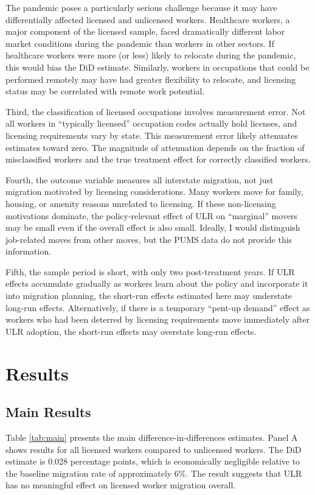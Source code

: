 \documentclass[12pt]{article}
\begin{document}
The pandemic poses a particularly serious challenge because it may have differentially affected licensed and unlicensed workers. Healthcare workers, a major component of the licensed sample, faced dramatically different labor market conditions during the pandemic than workers in other sectors. If healthcare workers were more (or less) likely to relocate during the pandemic, this would bias the DiD estimate. Similarly, workers in occupations that could be performed remotely may have had greater flexibility to relocate, and licensing status may be correlated with remote work potential.

Third, the classification of licensed occupations involves measurement error. Not all workers in ``typically licensed'' occupation codes actually hold licenses, and licensing requirements vary by state. This measurement error likely attenuates estimates toward zero. The magnitude of attenuation depends on the fraction of misclassified workers and the true treatment effect for correctly classified workers.

Fourth, the outcome variable measures all interstate migration, not just migration motivated by licensing considerations. Many workers move for family, housing, or amenity reasons unrelated to licensing. If these non-licensing motivations dominate, the policy-relevant effect of ULR on ``marginal'' movers may be small even if the overall effect is also small. Ideally, I would distinguish job-related moves from other moves, but the PUMS data do not provide this information.

Fifth, the sample period is short, with only two post-treatment years. If ULR effects accumulate gradually as workers learn about the policy and incorporate it into migration planning, the short-run effects estimated here may understate long-run effects. Alternatively, if there is a temporary ``pent-up demand'' effect as workers who had been deterred by licensing requirements move immediately after ULR adoption, the short-run effects may overstate long-run effects.

\section{Results}

\subsection{Main Results}

Table \ref{tab:main} presents the main difference-in-differences estimates. Panel A shows results for all licensed workers compared to unlicensed workers. The DiD estimate is 0.028 percentage points, which is economically negligible relative to the baseline migration rate of approximately 6\%. The result suggests that ULR has no meaningful effect on licensed worker migration overall.
\end{document}
